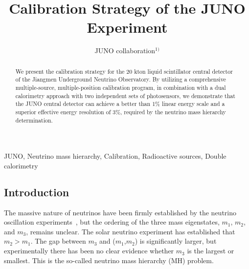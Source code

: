 \documentclass[a4paper,10pt,twoside]{cpc-hepnp}
\begin{document}
\begin{CJK*}{GB}{gbsn}


\footnotetext[0]{}

\title{Calibration Strategy of the JUNO Experiment}

\author{%
\quad JUNO collaboration$^{1)}$%
}
\maketitle


\address{%
  $^1$ School of Physics and Astronomy, Shanghai Jiao Tong University, Shanghai Key Laboratory for Particle Physics and Cosmology, Shanghai, 200240, China  \\
}


\begin{abstract}
  We present the calibration strategy for the 20 kton liquid
  scintillator central detector of the Jiangmen Underground Neutrino
  Observatory. By utilizing a comprehensive multiple-source,
  multiple-position calibration program, in combination with a dual
  calorimetry approach with two independent sets of photosensors, we
  demonstrate that the JUNO central detector can achieve a better than
  1\% linear energy scale and a superior 
  effective energy resolution of 3\%,
  required by the neutrino mass hierarchy determination.
\end{abstract}

\begin{keyword}
  JUNO, Neutrino mass hierarchy, Calibration, Radioactive sources,
  Double calorimetry
\end{keyword}

\begin{multicols}{2}

\section{Introduction}
The massive nature of neutrinos have been firmly established by the
neutrino oscillation experiments~\cite{PDG,McKeown-and-Vogel}, but the
ordering of the three mass eigenstates, $m_1$, $m_2$, and $m_3$,
remains unclear. The solar neutrino experiment has established that
$m_2 > m_1$. The gap between $m_3$ and ($m_1$,$m_2$) is significantly larger,
but experimentally there has been no clear evidence
whether $m_3$ is the largest or smallest. This is the so-called
neutrino mass hierarchy (MH) problem.


\end{multicols}
\end{CJK*}
\end{document}
